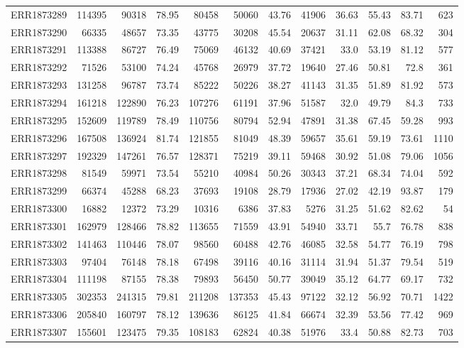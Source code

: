 \documentclass[12pt, oneside]{report}
\begin{document}
\begin{longtable}{@{}p{3.2cm}rrrrrrrrrrr@{}}
ERR1873289 & 114395 & 90318 & 78.95 & 80458 & 50060 & 43.76 & 41906 & 36.63 & 55.43 & 83.71 & 623 \\
ERR1873290 & 66335 & 48657 & 73.35 & 43775 & 30208 & 45.54 & 20637 & 31.11 & 62.08 & 68.32 & 304 \\
ERR1873291 & 113388 & 86727 & 76.49 & 75069 & 46132 & 40.69 & 37421 & 33.0 & 53.19 & 81.12 & 577 \\
ERR1873292 & 71526 & 53100 & 74.24 & 45768 & 26979 & 37.72 & 19640 & 27.46 & 50.81 & 72.8 & 361 \\
ERR1873293 & 131258 & 96787 & 73.74 & 85222 & 50226 & 38.27 & 41143 & 31.35 & 51.89 & 81.92 & 573 \\
ERR1873294 & 161218 & 122890 & 76.23 & 107276 & 61191 & 37.96 & 51587 & 32.0 & 49.79 & 84.3 & 733 \\
ERR1873295 & 152609 & 119789 & 78.49 & 110756 & 80794 & 52.94 & 47891 & 31.38 & 67.45 & 59.28 & 993 \\
ERR1873296 & 167508 & 136924 & 81.74 & 121855 & 81049 & 48.39 & 59657 & 35.61 & 59.19 & 73.61 & 1110 \\
ERR1873297 & 192329 & 147261 & 76.57 & 128371 & 75219 & 39.11 & 59468 & 30.92 & 51.08 & 79.06 & 1056 \\
ERR1873298 & 81549 & 59971 & 73.54 & 55210 & 40984 & 50.26 & 30343 & 37.21 & 68.34 & 74.04 & 592 \\
ERR1873299 & 66374 & 45288 & 68.23 & 37693 & 19108 & 28.79 & 17936 & 27.02 & 42.19 & 93.87 & 179 \\
ERR1873300 & 16882 & 12372 & 73.29 & 10316 & 6386 & 37.83 & 5276 & 31.25 & 51.62 & 82.62 & 54 \\
ERR1873301 & 162979 & 128466 & 78.82 & 113655 & 71559 & 43.91 & 54940 & 33.71 & 55.7 & 76.78 & 838 \\
ERR1873302 & 141463 & 110446 & 78.07 & 98560 & 60488 & 42.76 & 46085 & 32.58 & 54.77 & 76.19 & 798 \\
ERR1873303 & 97404 & 76148 & 78.18 & 67498 & 39116 & 40.16 & 31114 & 31.94 & 51.37 & 79.54 & 519 \\
ERR1873304 & 111198 & 87155 & 78.38 & 79893 & 56450 & 50.77 & 39049 & 35.12 & 64.77 & 69.17 & 732 \\
ERR1873305 & 302353 & 241315 & 79.81 & 211208 & 137353 & 45.43 & 97122 & 32.12 & 56.92 & 70.71 & 1422 \\
ERR1873306 & 205840 & 160797 & 78.12 & 139636 & 86125 & 41.84 & 66674 & 32.39 & 53.56 & 77.42 & 969 \\
ERR1873307 & 155601 & 123475 & 79.35 & 108183 & 62824 & 40.38 & 51976 & 33.4 & 50.88 & 82.73 & 703 \\

\end{longtable}
\end{document}
